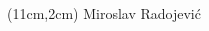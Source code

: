 \begin{changemargin}{-0cm}{-0cm}

\begin{textblock*}{\textwidth}(11cm,2cm)
	{\Huge Miroslav Radojevi\'{c}}
\end{textblock*}

\end{changemargin}

